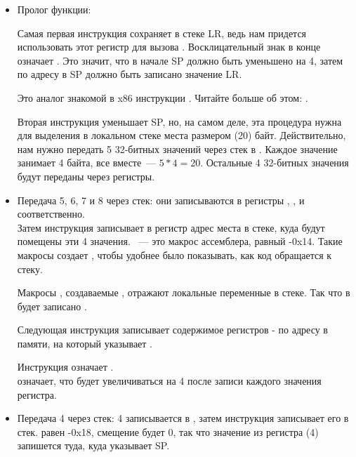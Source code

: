 \begin{itemize}
\item Пролог функции:

Самая первая инструкция  
сохраняет в стеке \ac{LR}, ведь нам придется использовать этот регистр для вызова \printf.
Восклицательный знак в конце означает .
Это значит, что в начале \ac{SP} должно быть уменьшено на 4, затем по адресу в \ac{SP} должно быть записано значение \ac{LR}.

Это аналог знакомой в x86 инструкции \PUSH. Читайте больше об этом: .

Вторая инструкция  уменьшает  \ac{SP}, но, на самом деле, эта процедура нужна для выделения в локальном стеке места размером  (20) байт.
Действительно, нам нужно передать 5 32-битных значений через стек в \printf. Каждое значение занимает 4 байта, все вместе~--- $5*4=20$.
Остальные 4 32-битных значения будут переданы через регистры.

\item Передача 5, 6, 7 и 8 через стек:
они записываются в регистры , ,  и  соответственно.\\
Затем инструкция  
записывает в регистр  адрес места в стеке, куда будут помещены эти 4 значения.
~--- это макрос ассемблера, равный -0x14.
Такие макросы создает \IDA, чтобы удобнее было показывать, как код обращается к стеку.

Макросы , создаваемые \IDA, отражают локальные переменные в стеке. Так что в  будет записано .

Следующая инструкция  записывает содержимое регистров - по адресу в памяти, на который указывает .

Инструкция  означает .\\
 означает, что  будет увеличиваться на 4 после записи каждого значения регистра.

\item Передача 4 через стек:
4 записывается в , затем инструкция  записывает его в стек.
 равен -0x18, смещение будет 0, 
так что значение из регистра  (4) запишется туда, куда указывает \ac{SP}.


\end{itemize}
